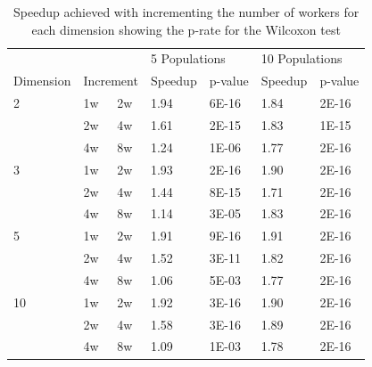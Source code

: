 \documentclass[review]{elsarticle}
\begin{document}
\begin{table}[h!tbp]
    \small
    \caption{Speedup achieved with incrementing the number of workers for each dimension showing the p-rate for the Wilcoxon test}
    \label{tab:speedup:test}
    \vspace{0.25cm}
    \centering
    \begin{tabular}{lllllll}
              &               &               & \multicolumn{2}{l}{5 Populations} & \multicolumn{2}{l}{10 Populations} \\
    Dimension & \multicolumn{2}{l}{Increment} & Speedup         & p-value         & Speedup          & p-value         \\
    2         & 1w            & 2w            & 1.94            & 6E-16           & 1.84             & 2E-16           \\
              & 2w            & 4w            & 1.61            & 2E-15           & 1.83             & 1E-15           \\
              & 4w            & 8w            & 1.24            & 1E-06           & 1.77             & 2E-16           \\
    3         & 1w            & 2w            & 1.93            & 2E-16           & 1.90             & 2E-16           \\
              & 2w            & 4w            & 1.44            & 8E-15           & 1.71             & 2E-16           \\
              & 4w            & 8w            & 1.14            & 3E-05           & 1.83             & 2E-16           \\
    5         & 1w            & 2w            & 1.91            & 9E-16           & 1.91             & 2E-16           \\
              & 2w            & 4w            & 1.52            & 3E-11           & 1.82             & 2E-16           \\
              & 4w            & 8w            & 1.06            & 5E-03           & 1.77             & 2E-16           \\
    10        & 1w            & 2w            & 1.92            & 3E-16           & 1.90             & 2E-16           \\
              & 2w            & 4w            & 1.58            & 3E-16           & 1.89             & 2E-16           \\
              & 4w            & 8w            & 1.09            & 1E-03           & 1.78             & 2E-16           \\

\end{tabular}
\end{table}
\end{document}
